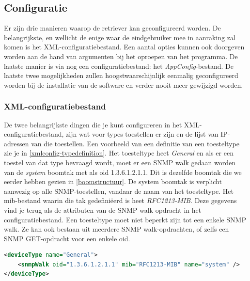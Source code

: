 \subsection{Configuratie}
\label{snmp-data-retriever-configuratie}
Er zijn drie manieren waarop de retriever kan geconfigureerd worden. De belangrijkste,
en wellicht de enige waar de eindgebruiker mee in aanraking zal komen is het XML-configuratiebestand.
Een aantal opties kunnen ook doorgeven worden aan de hand van argumenten bij het oproepen van het programma.
De laatste manier is via nog een configuratiebestand: het \emph{AppConfig}-bestand. De laatste twee mogelijkheden
zullen hoogstwaarschijnlijk eenmalig geconfigureerd worden bij de installatie van de software en verder nooit meer gewijzigd worden.



\subsubsection{XML-configuratiebestand}

De twee belangrijkste dingen die je kunt configureren in het XML-configuratiebestand, zijn wat voor types toestellen er zijn en de lijst van IP-adressen van die toestellen.
Een voorbeeld van een definitie van een toesteltype zie je in \cref{xmlconfig-typedefinition}.
Het toesteltype heet \emph{General} en als er een toestel van dat type bevraagd wordt,
moet er een SNMP walk gedaan worden van de \textit{system} boomtak met als \gls{oid} 1.3.6.1.2.1.1.
Dit is dezelfde boomtak die we eerder hebben gezien in \cref{boomstructuur}.
De system boomtak is verplicht aanwezig op alle SNMP-toestellen, vandaar de naam van het toesteltype.
Het \gls{mib}-bestand waarin die tak gedefiniëerd is heet \emph{RFC1213-MIB}.
Deze gegevens vind je terug als de attributen van de SNMP walk-opdracht in het configuratiebestand.
Een toesteltype moet niet beperkt zijn tot een enkele SNMP walk. Ze kan ook bestaan uit meerdere SNMP walk-opdrachten,
of zelfs een SNMP GET-opdracht voor een enkele \gls{oid}.

\begin{lstlisting}[language=XML, float=h, caption={Definitie van een toesteltype in het XML-configuratiebestand}, label=xmlconfig-typedefinition]
<deviceType name="General">
	<snmpWalk oid="1.3.6.1.2.1.1" mib="RFC1213-MIB" name="system" />
</deviceType>
\end{lstlisting}

